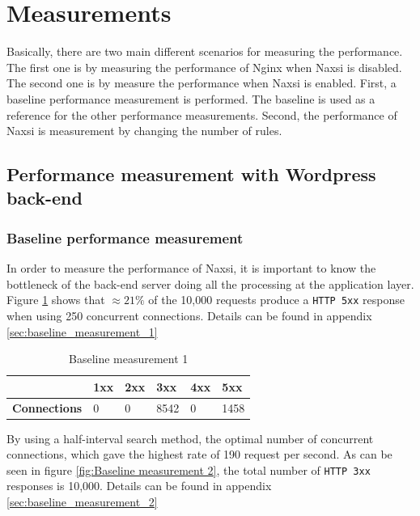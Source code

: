\documentclass[Measurements]{subfiles}
\begin{document}
\section{Measurements}

\label{sec:Measurements}
Basically, there are two main different scenarios for measuring the performance. The first one is by measuring the performance of Nginx when Naxsi is disabled. The second one is by measure the performance when Naxsi is enabled. First, a baseline performance measurement is performed. The baseline is used as a reference for the other performance measurements. Second, the performance of Naxsi is measurement by changing the number of rules.

\subsection{Performance measurement with Wordpress back-end}

\subsubsection{Baseline performance measurement}
\label{sec:Baseline performance measurement}
In order to measure the performance of Naxsi, it is important to know the bottleneck of the back-end server doing all the processing at the application layer. Figure \ref{fig:Baseline measurement 1} shows that $\approx 21\%$ of the 10,000 requests produce a \verb+HTTP 5xx+ response when using 250 concurrent connections. Details can be found in appendix \ref{sec:baseline_measurement_1}

\begin{table}[!h]
\caption{Baseline measurement 1}
\begin{tabular}{|p{2cm}|p{}|p{}|p{}|p{}|p{}|}
\hline
 & \textbf{1xx} & \textbf{2xx} & \textbf{3xx} & \textbf{4xx} & \textbf{5xx} \\ \hline
\textbf{Connections} & 0 & 0 & 8542 & 0 & 1458 \\ \hline
\end{tabular}
\label{fig:Baseline measurement 1}
\end{table}

By using a half-interval search method, the optimal number of concurrent connections, which gave the highest rate of 190 request per second. As can be seen in figure \ref{fig:Baseline measurement 2}, the total number of \verb+HTTP 3xx+ responses is 10,000. Details can be found in appendix \ref{sec:baseline_measurement_2}
\end{document}
